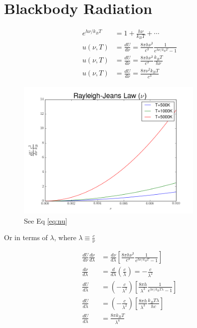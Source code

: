 \documentclass[12pt]{article}
\begin{document}
  \clearpage

  \section{Blackbody Radiation}
  
  \begin{align} 
    e^{h\nu / k_B T} &= 1 + \frac{h \nu}{k_B T} + \cdots \nonumber \\
    u(\nu, T) &= \frac{dU}{d\nu} =
    \frac{8\pi h \nu^3}{c^3}\frac{1}{e^{h\nu/k_B T}-1} \nonumber \\
    u(\nu, T) &= \frac{dU}{d\nu}  =
      \frac{8\pi h \nu^3}{c^3}\frac{k_B T}{h \nu} \nonumber \\
    \label{eq:nu}
    u(\nu, T) &= \frac{dU}{d\nu}  =
      \frac{8\pi \nu^2 k_B T}{c^3 }
  \end{align}

  \begin{figure}[h]
    \centering
    \includegraphics[width=0.8\textwidth]{Problem9a.png}
    \caption{See Eq \ref{eq:nu}}
  \end{figure}

  \clearpage

  Or in terms of $\lambda$, where $\lambda \equiv \frac{c}{\nu}$

  \begin{align}
    \frac{dU}{d\nu}\frac{d\nu}{d\lambda} &= \frac{d\nu}{d\lambda}\left[\frac{8\pi h \nu^3}{c^3 }\frac{1}{e^{h\nu/k_BT}-1}\right] \nonumber\\
    \frac{d\nu}{d\lambda} &= \frac{d}{d\lambda}\left(\frac{c}{\lambda}\right) = -\frac{c}{\lambda^2} \nonumber\\
    \frac{dU}{d\lambda} &= \left(-\frac{c}{\lambda^2}\right)\left[\frac{8\pi h}{\lambda^3}\frac{1}{e^{hc/k_BT\lambda}-1}\right] \nonumber\\
    \frac{dU}{d\lambda} &= \left(-\frac{c}{\lambda^2}\right)\left[\frac{8\pi h}{\lambda^3}\frac{k_BT\lambda}{hc}\right] \nonumber\\
    \label{eq:lambda}
    \frac{dU}{d\lambda} &= \frac{8\pi k_BT}{\lambda^4}
  \end{align}
\end{document}
